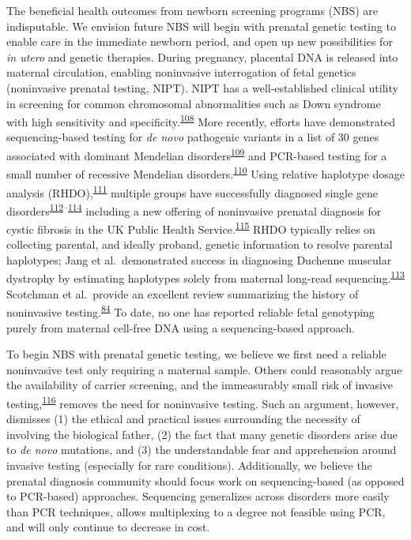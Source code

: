 \documentclass[11pt,letterpaper,oneside]{book}
\begin{document}
The beneficial health outcomes from newborn screening programs (NBS) are indisputable.
We envision future NBS will begin with prenatal genetic testing to enable care in the immediate newborn period, and open up new possibilities for \emph{in utero} and genetic therapies.
During pregnancy, placental DNA is released into maternal circulation, enabling noninvasive interrogation of fetal genetics (noninvasive prenatal testing, NIPT).
NIPT has a well-established clinical utility in screening for common chromosomal abnormalities such as Down syndrome with high sensitivity and specificity.\textsuperscript{\protect\hyperlink{ref-mackie:2017aa}{108}}
More recently, efforts have demonstrated sequencing-based testing for \emph{de novo} pathogenic variants in a list of 30 genes associated with dominant Mendelian disorders\textsuperscript{\protect\hyperlink{ref-zhang:2019aa}{109}} and PCR-based testing for a small number of recessive Mendelian disorders.\textsuperscript{\protect\hyperlink{ref-tsao:2019ab}{110}}
Using relative haplotype dosage analysis (RHDO),\textsuperscript{\protect\hyperlink{ref-lo:2010aa}{111}} multiple groups have successfully diagnosed single gene disorders\textsuperscript{\protect\hyperlink{ref-hui:2017aa}{112}--\protect\hyperlink{ref-vermeulen:2017aa}{114}} including a new offering of noninvasive prenatal diagnosis for cystic fibrosis in the UK Public Health Service.\textsuperscript{\protect\hyperlink{ref-chandler:2020aa}{115}}
RHDO typically relies on collecting parental, and ideally proband, genetic information to resolve parental haplotypes; Jang et al.~demonstrated success in diagnosing Duchenne muscular dystrophy by estimating haplotypes solely from maternal long-read sequencing.\textsuperscript{\protect\hyperlink{ref-jang:2018aa}{113}}
Scotchman et al.~provide an excellent review summarizing the history of noninvasive testing.\textsuperscript{\protect\hyperlink{ref-scotchman:2020aa}{84}}
To date, no one has reported reliable fetal genotyping purely from maternal cell-free DNA using a sequencing-based approach.

To begin NBS with prenatal genetic testing, we believe we first need a reliable noninvasive test only requiring a maternal sample.
Others could reasonably argue the availability of carrier screening, and the immeasurably small risk of invasive testing,\textsuperscript{\protect\hyperlink{ref-salomon:2019aa}{116}} removes the need for noninvasive testing.
Such an argument, however, dismisses (1) the ethical and practical issues surrounding the necessity of involving the biological father, (2) the fact that many genetic disorders arise due to \emph{de novo} mutations, and (3) the understandable fear and apprehension around invasive testing (especially for rare conditions).
Additionally, we believe the prenatal diagnosis community should focus work on sequencing-based (as opposed to PCR-based) approaches.
Sequencing generalizes across disorders more easily than PCR techniques, allows multiplexing to a degree not feasible using PCR, and will only continue to decrease in cost.
\end{document}
